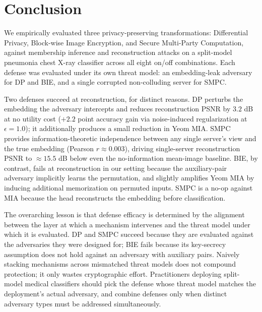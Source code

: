\documentclass[conference]{IEEEtran}
\begin{document}
\section{Conclusion}
We empirically evaluated three privacy-preserving transformations: Differential Privacy, Block-wise Image Encryption, and Secure Multi-Party Computation, against membership inference and reconstruction attacks on a split-model pneumonia chest X-ray classifier across all eight on/off combinations. {Each defense was evaluated under its own threat model:} an embedding-leak adversary for DP and BIE, and a single corrupted non-colluding server for SMPC.

Two defenses succeed at reconstruction, for distinct reasons. DP perturbs the embedding the adversary intercepts and reduces reconstruction PSNR by $3.2$ dB at no utility cost ($+2.2$ point accuracy gain via noise-induced regularization at $\epsilon=1.0$); it additionally produces a small reduction in Yeom MIA. SMPC provides information-theoretic independence between any single server's view and the true embedding (Pearson $r \approx 0.003$), driving single-server reconstruction PSNR to $\approx 15.5$ dB below even the no-information mean-image baseline. BIE, by contrast, fails at reconstruction in our setting because the auxiliary-pair adversary implicitly learns the permutation, and slightly amplifies Yeom MIA by inducing additional memorization on permuted inputs. SMPC is a no-op against MIA because the head reconstructs the embedding before classification.

The overarching lesson is that defense efficacy is determined by the alignment between the layer at which a mechanism intervenes and the threat model under which it is evaluated. DP and SMPC succeed because they are evaluated against the adversaries they were designed for; BIE fails because its key-secrecy assumption does not hold against an adversary with auxiliary pairs. Naively stacking mechanisms across mismatched threat models does not compound protection; it only wastes cryptographic effort. Practitioners deploying split-model medical classifiers should pick the defense whose threat model matches the deployment's actual adversary, and combine defenses only when distinct adversary types must be addressed simultaneously.
\end{document}
